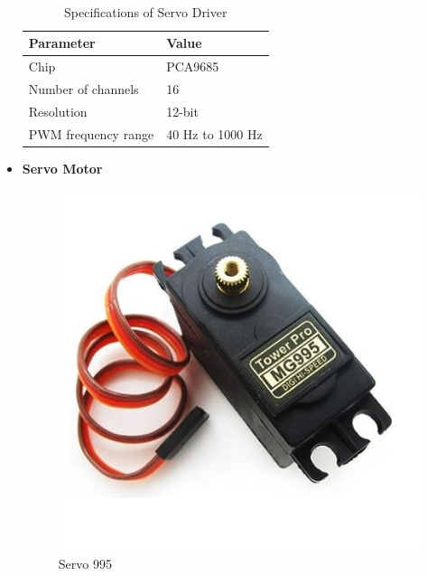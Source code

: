 \documentclass[12pt,a4paper]{report}
\begin{document}
\begin{itemize}
\begin{table}[H]
\begin{center}
\newpage
\caption{Specifications of Servo Driver}%
\hspace*{0.2in}
\\
\begin{tabular}{| p{5cm} | p{5cm} |}
\hline
{\bf{Parameter}}             &{\bf{Value}}           \\ \hline
Chip
& PCA9685 \\ \hline

Number of channels
& 16 \\ \hline

Resolution
& 12-bit \\ \hline

PWM frequency range
& 40 Hz to 1000 Hz \\ \hline

\end{tabular}
\end{center}
\end{table}




\newpage
\item {\bf{Servo Motor}}
\begin{figure}[!htb]
\begin{center}
\includegraphics[scale=0.6]{images/hardware/Servo995.png}
\caption{Servo 995}
\end{center}
\end{figure}


\end{itemize}
\end{document}
